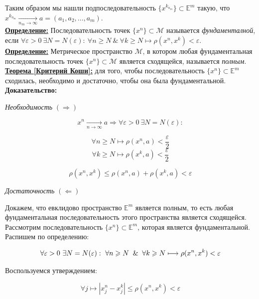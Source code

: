 \documentclass[a4paper,12pt]{article} %
\begin{document}
	Таким образом мы нашли подпоследовательность $\{x^{k_{n_m}} \} \subset \mathbb{E}^m$ такую, что $x^{k_{n_m}} \xrightarrow[n_m \to \infty]{} a = (a_1, a_2, \dots, a_m)$.\\
	
	\underline{\textbf{Определение:}} Последовательность точек $\{x^n \} \subset \mathscr{M}$ называется \textit{фундаменталной}, если $\forall \varepsilon > 0 ~ \exists N = N(\varepsilon) : ~ \forall n \geqslant N ~ \& ~ \forall k \geqslant N \mapsto \rho(x^n, x^k) < \varepsilon$.\\
	
	\underline{\textbf{Определение:}} Метрическое пространство $\mathscr{M}$, в котором любая фундаментальная последовательность точек $\{x^n \} \subset \mathscr{M}$ является сходящейся, называется \textit{полным}.\\
	
	\underline{\textbf{Теорема [Критерий Коши]:}} для того, чтобы последовательность $\{x^n \} \subset \mathbb{E}^m$ сходилась, необходимо и достаточно, чтобы она была фундаментальной.\\
	
	\textbf{Доказательство:} 
	
	\textit{Необходимость} $(\Rightarrow)$
	
	\[ x^n \xrightarrow[n \to \infty]{} a \Rightarrow \forall \varepsilon > 0 ~ \exists N = N(\varepsilon) : \]
	
	\[ \forall n \geqslant N \mapsto \rho(x^n, a) < \frac{\varepsilon}{2} \]
	\[ \forall k \geqslant N \mapsto \rho(x^k, a) < \frac{\varepsilon}{2} \]
	
	\[ \rho(x^n, x^k) \leqslant \rho(x^n, a) + \rho(x^k, a) < \varepsilon \]
	
	\textit{Достаточность} $(\Leftarrow)$ 
	
	Докажем, что евклидово пространство $\mathbb{E}^m$ является полным, то есть любая фундаментальная последовательность этого пространства является сходящейся.\\
	
	Рассмотрим последовательность $\{x^n \} \subset \mathbb{E}^m$, которая является фундаментальной. Распишем по определению:
	
	$$ \forall \varepsilon > 0 ~ \exists N = N(\varepsilon) : ~ \forall n \geqslant N \And \forall k \geqslant N \longmapsto \rho(x^n, x^k) < \varepsilon $$
	
	Воспользуемся утверждением:
	
	\[ \forall j \longmapsto |x_j^n - x_j^k| \leqslant \rho(x^n, x^k) < \varepsilon \]
	
\end{document}
